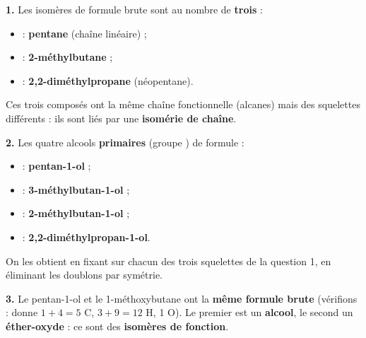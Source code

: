 \documentclass[11pt]{article}
\begin{document}
\begin{corrige}
\textbf{1.} Les isomères de formule brute  sont au nombre de \textbf{trois} :
\begin{itemize}
\item {} : \textbf{pentane} (chaîne linéaire) ;
\item {} : \textbf{2-méthylbutane} ;
\item {} : \textbf{2,2-diméthylpropane} (néopentane).
\end{itemize}
Ces trois composés ont la même chaîne fonctionnelle (alcanes) mais des squelettes différents : ils sont liés par une \textbf{isomérie de chaîne}.

\textbf{2.} Les quatre alcools \textbf{primaires} (groupe ) de formule  :
\begin{itemize}
\item {} : \textbf{pentan-1-ol} ;
\item {} : \textbf{3-méthylbutan-1-ol} ;
\item {} : \textbf{2-méthylbutan-1-ol} ;
\item {} : \textbf{2,2-diméthylpropan-1-ol}.
\end{itemize}
On les obtient en fixant  sur chacun des trois squelettes de la question 1, en éliminant les doublons par symétrie.

\textbf{3.} Le pentan-1-ol  et le 1-méthoxybutane  ont la \textbf{même formule brute}  (vérifions :  donne $1+4=5$ C, $3+9=12$ H, 1 O). Le premier est un \textbf{alcool}, le second un \textbf{éther-oxyde} : ce sont des \textbf{isomères de fonction}.
\end{corrige}
\end{document}
